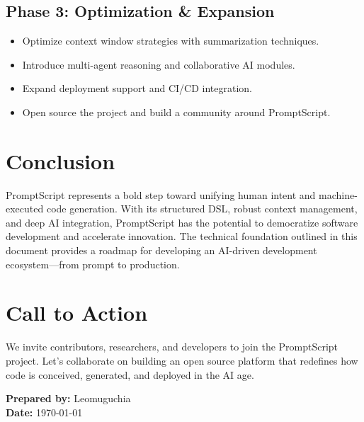\documentclass[11pt]{article}
\begin{document}
\subsection{Phase 3: Optimization \& Expansion}
\begin{itemize}
    \item Optimize context window strategies with summarization techniques.
    \item Introduce multi-agent reasoning and collaborative AI modules.
    \item Expand deployment support and CI/CD integration.
    \item Open source the project and build a community around PromptScript.
\end{itemize}

\section{Conclusion}
PromptScript represents a bold step toward unifying human intent and machine-executed code generation. With its structured DSL, robust context management, and deep AI integration, PromptScript has the potential to democratize software development and accelerate innovation. The technical foundation outlined in this document provides a roadmap for developing an AI-driven development ecosystem—from prompt to production.

\section{Call to Action}
We invite contributors, researchers, and developers to join the PromptScript project. Let’s collaborate on building an open source platform that redefines how code is conceived, generated, and deployed in the AI age.

\vspace{1em}
\noindent\textbf{Prepared by:} Leomuguchia \\
\textbf{Date:} \today
\end{document}
